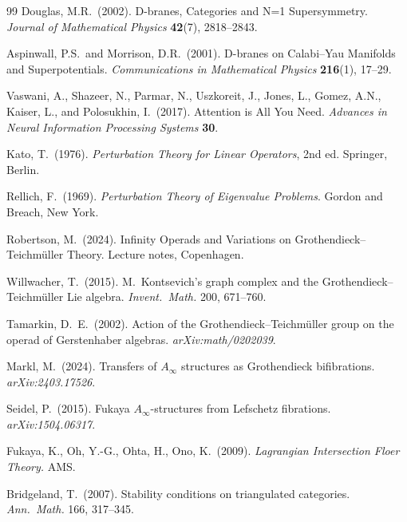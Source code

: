 \documentclass[11pt]{amsart}
\begin{document}
\begin{thebibliography}{99}
Douglas, M.R.\ (2002).
D-branes, Categories and N=1 Supersymmetry.
\textit{Journal of Mathematical Physics} \textbf{42}(7), 2818--2843.

Aspinwall, P.S.\ and Morrison, D.R.\ (2001).
D-branes on Calabi--Yau Manifolds and Superpotentials.
\textit{Communications in Mathematical Physics} \textbf{216}(1), 17--29.

Vaswani, A., Shazeer, N., Parmar, N., Uszkoreit, J., Jones, L.,
Gomez, A.N., Kaiser, L., and Polosukhin, I.\ (2017).
Attention is All You Need.
\textit{Advances in Neural Information Processing Systems} \textbf{30}.

Kato, T.\ (1976).
\textit{Perturbation Theory for Linear Operators}, 2nd ed.
Springer, Berlin.

Rellich, F.\ (1969).
\textit{Perturbation Theory of Eigenvalue Problems}.
Gordon and Breach, New York.



Robertson, M.\ (2024).
Infinity Operads and Variations on Grothendieck--Teichm{\"{u}}ller Theory.
Lecture notes, Copenhagen.

Willwacher, T.\ (2015).
M.\ Kontsevich's graph complex and the Grothendieck--Teichm{\"{u}}ller Lie algebra.
\emph{Invent.\ Math.} 200, 671--760.

Tamarkin, D.~E.\ (2002).
Action of the Grothendieck--Teichm{\"u}ller group on the operad of
Gerstenhaber algebras.
\emph{arXiv:math/0202039}.

Markl, M.\ (2024).
Transfers of $A_\infty$ structures as Grothendieck bifibrations.
\emph{arXiv:2403.17526}.

Seidel, P.\ (2015).
Fukaya $A_\infty$-structures from Lefschetz fibrations.
\emph{arXiv:1504.06317}.

Fukaya, K., Oh, Y.-G., Ohta, H., Ono, K.\ (2009).
\emph{Lagrangian Intersection Floer Theory.}
AMS.

Bridgeland, T.\ (2007).
Stability conditions on triangulated categories.
\emph{Ann.\ Math.} 166, 317--345.


\end{thebibliography}
\end{document}
